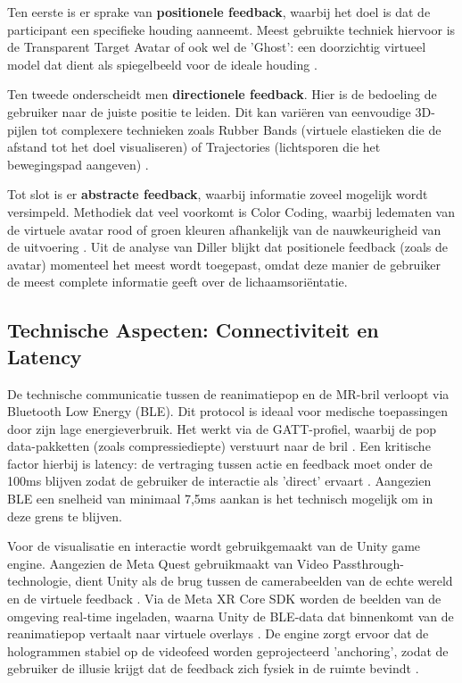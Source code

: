 Ten eerste is er sprake van \textbf{positionele feedback}, waarbij het doel is dat de participant een specifieke houding aanneemt. Meest gebruikte techniek hiervoor is de Transparent
Target Avatar of ook wel de 'Ghost': een doorzichtig virtueel model dat dient als spiegelbeeld voor de ideale houding \autocite{Diller2024}.

Ten tweede onderscheidt men \textbf{directionele feedback}. Hier is de bedoeling de gebruiker naar de juiste positie te leiden. Dit kan variëren van eenvoudige 3D-pijlen tot complexere technieken
zoals Rubber Bands (virtuele elastieken die de afstand tot het doel visualiseren) of Trajectories (lichtsporen die het bewegingspad aangeven) \autocite{Diller2024}. 

Tot slot is er \textbf{abstracte feedback}, waarbij informatie zoveel mogelijk wordt versimpeld. Methodiek dat veel voorkomt is Color Coding, waarbij ledematen van de virtuele avatar rood of groen
kleuren afhankelijk van de nauwkeurigheid van de uitvoering \autocite{Diller2024}. Uit de analyse van Diller blijkt dat positionele feedback (zoals de avatar) momenteel het meest wordt toegepast, omdat deze manier
de gebruiker de meest complete informatie geeft over de lichaamsoriëntatie.


\subsection{Technische Aspecten: Connectiviteit en Latency}
De technische communicatie tussen de reanimatiepop en de MR-bril verloopt via Bluetooth Low Energy (BLE). Dit protocol is ideaal voor medische toepassingen door zijn lage energieverbruik.
Het werkt via de GATT-profiel, waarbij de pop data-pakketten (zoals compressiediepte) verstuurt naar de bril \autocite{ChaariFourati2020}. Een kritische factor hierbij is latency:
de vertraging tussen actie en feedback moet onder de 100ms blijven zodat de gebruiker de interactie als 'direct' ervaart \autocite{ChaariFourati2020}.
Aangezien BLE een snelheid van minimaal 7,5ms aankan is het technisch mogelijk om in deze grens te blijven.

Voor de visualisatie en interactie wordt gebruikgemaakt van de Unity game engine. Aangezien de Meta Quest gebruikmaakt van Video Passthrough-technologie, dient Unity als de brug tussen
de camerabeelden van de echte wereld en de virtuele feedback \autocite{Raymer2023}. Via de Meta XR Core SDK worden de beelden van de omgeving real-time ingeladen, waarna Unity de 
BLE-data dat binnenkomt van de reanimatiepop vertaalt naar virtuele overlays \autocite{Glover2019}. De engine zorgt ervoor dat de hologrammen stabiel op de videofeed worden geprojecteerd 'anchoring', 
zodat de gebruiker de illusie krijgt dat de feedback zich fysiek in de ruimte bevindt \autocite{Glover2019}. 

